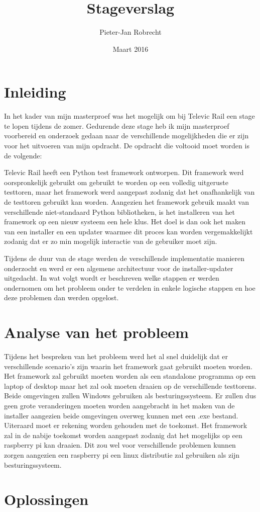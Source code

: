 \documentclass{article}
\title{Stageverslag}
\author{\mbox{Pieter-Jan} Robrecht}
\date{Maart 2016}
\begin{document}


\clearpage
\setcounter{page}{1}
\tableofcontents
\clearpage

\section{Inleiding}
In het kader van mijn masterproef was het mogelijk om bij Televic Rail een stage te lopen tijdens de zomer. 
Gedurende deze stage heb ik mijn masterproef voorbereid en onderzoek gedaan naar de verschillende mogelijkheden die er zijn voor het uitvoeren van mijn opdracht.
De opdracht die voltooid moet worden is de volgende:
\begin{displayquote}
Televic Rail heeft een Python test framework ontworpen. 
Dit framework werd oorspronkelijk gebruikt om gebruikt te worden op een volledig uitgeruste testtoren, maar het framework werd aangepast zodanig dat het onafhankelijk van de testtoren gebruikt kan worden.
Aangezien het framework gebruik maakt van verschillende niet-standaard Python bibliotheken, is het installeren van het framework op een nieuw systeem een hele klus.
Het doel is dan ook het maken van een installer en een updater waarmee dit proces kan worden vergemakkelijkt zodanig dat er zo min mogelijk interactie van de gebruiker moet zijn.
\end{displayquote}
Tijdens de duur van de stage werden de verschillende implementatie manieren onderzocht en werd er een algemene architectuur voor de installer-updater uitgedacht.
In wat volgt wordt er beschreven welke stappen er werden ondernomen om het probleem onder te verdelen in enkele logische stappen en hoe deze problemen dan werden opgelost. 

\section{Analyse van het probleem}
Tijdens het bespreken van het probleem werd het al snel duidelijk dat er verschillende scenario's zijn waarin het framework gaat gebruikt moeten worden. Het framework zal gebruikt moeten worden als een standalone programma op een laptop of desktop maar het zal ook moeten draaien op de verschillende testtorens. Beide omgevingen zullen Windows gebruiken als besturingssysteem. Er zullen dus geen grote veranderingen moeten worden aangebracht in het maken van de installer aangezien beide omgevingen overweg kunnen met een .exe bestand. Uiteraard moet er rekening worden gehouden met de toekomst. Het framework zal in de nabije toekomst worden aangepast zodanig dat het mogelijks op een raspberry pi kan draaien. Dit zou wel voor verschillende problemen kunnen zorgen aangezien een raspberry pi een linux distributie zal gebruiken als zijn besturingssysteem. 

\section{Oplossingen}
\end{document}
